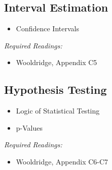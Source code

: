 \documentclass{article}
\begin{document}
\subsection{Interval Estimation}

\begin{itemize}
   \item Confidence Intervals
\end{itemize}
\textit{Required Readings:}
\begin{itemize}
  \item Wooldridge, Appendix C5
\end{itemize}
\subsection{Hypothesis Testing}
\begin{itemize}
   \item Logic of Statistical Testing
   \item p-Values
\end{itemize}
\textit{Required Readings:}
\begin{itemize}
  \item Wooldridge, Appendix C6-C7 
\end{itemize}




\end{document}
